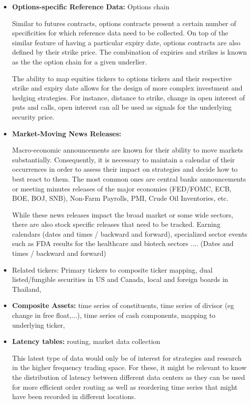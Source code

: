 \begin{itemize}
\item \textbf{Options-specific Reference Data:} Options chain

Similar to futures contracts, options contracts present a certain number of specificities for which reference data need to be collected. On top of the similar feature of having a particular expiry date, options contracts are also defined by their strike price. The combination of expiries and strikes is known as the the option chain for a given underlier. 

The ability to map equities tickers to options tickers and their respective strike and expiry date allows for the design of more complex investment and hedging strategies. For instance, distance to strike, change in open interest of puts and calls, open interest can all be used as signals for the underlying security price.

\item \textbf{Market-Moving News Releases:} 

Macro-economic announcements are known for their ability to move markets substantially. Consequently, it is necessary to maintain a calendar of their occurrences in order to assess their impact on strategies and decide how to best react to them. The most common ones are central banks announcements or meeting minutes releases of the major economies (FED/FOMC, ECB, BOE, BOJ, SNB), Non-Farm Payrolls, PMI, Crude Oil Inventories, etc.

While these news releases impact the broad market or some wide sectors, there are also stock specific releases that need to be tracked. 
Earning calendars (dates and times / backward and forward), specialized sector events such as FDA results for the healthcare and biotech sectors  .... (Dates and times / backward and forward)



\item Related tickers: Primary tickers to composite ticker mapping, dual listed/fungible securities in US and Canada, local and foreign boards in Thailand, 

\item \textbf{Composite Assets:} time series of constituents, time series of divisor (eg change in free float,...), time series of cash components, mapping to underlying ticker, 

\item \textbf{Latency tables:} routing, market data collection

This latest type of data would only be of interest for strategies and research in the higher frequency trading space. For these, it might be relevant to know the distribution of latency between different data centers as they can be used for more efficient order routing as well as reordering time series that might have been recorded in different locations.

\end{itemize}

